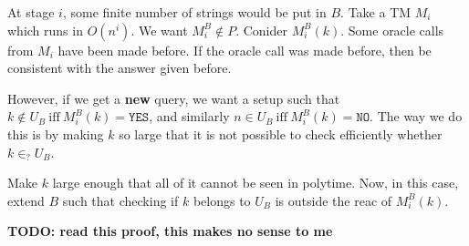 At stage $i$, some finite number of strings would be put in $B$. Take a TM
$M_i$ which runs in $O(n^i)$. We want $M_i^B \notin P$. Conider
$M_i^B(k)$. Some oracle calls from $M_i$ have been made before. 
If the oracle call was made before, then be consistent with the answer 
given before.

However, if we get a \textbf{new} query, we want a setup such that $k \notin U_B~\text{iff}~M_i^B(k) = \texttt{YES}$,
and similarly $n \in U_B~\text{iff}~M_i^B(k) = \texttt{NO}$. The way we do this 
is by making $k$ so large that it is not possible to check efficiently whether
$k \in_? U_B$.

Make $k$ large enough that all of it cannot be seen in polytime. Now, in this case,
extend $B$ such that checking if $k$ belongs to $U_B$ is outside the reac
of $M_i^B(k)$.

\textbf{TODO: read this proof, this makes no sense to me}



